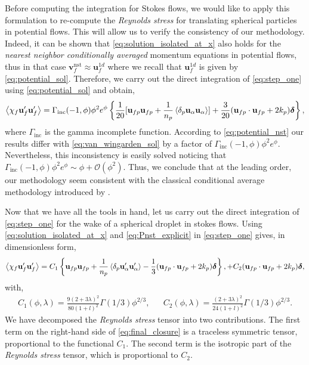 Before computing the integration for Stokes flows, we would like to apply this formulation to re-compute the \textit{Reynolds stress} for translating spherical particles in potential flows. 
This will allow us to verify the consistency of our methodology. 
Indeed, it can be shown that \ref{eq:solution_isolated_at_x} also holds for the \textit{nearest neighbor conditionally averaged} momentum equations in potential flows, thus in that case $\textbf{v}^\text{nst}_f \approx \textbf{u}_f^{1d}$ where we recall that $ \textbf{u}_f^{1d}$ is given by \ref{eq:potential_sol}.
Therefore, we carry out the direct integration of \ref{eq:step_one} using \ref{eq:potential_sol} and obtain, 
\begin{equation}
    \avg{\chi_f \textbf{u}_f'\textbf{u}_f'}
    = \Gamma_\text{inc}(-1,\phi)\phi^2 e^\phi \left\{
        \frac{1}{20}[\textbf{u}_{fp}\textbf{u}_{fp}+ \frac{1}{n_p}\pavg{\textbf{u}_\alpha\textbf{u}_\alpha}]
        + 
        \frac{3}{20} (\textbf{u}_{fp}\cdot \textbf{u}_{fp} + 2k_p)\bm\delta
    \right\},
    \label{eq:potential_nst}
\end{equation}
where $\Gamma_\text{inc}$ is the gamma incomplete function. 
According to \ref{eq:potential_nst} our results differ with \ref{eq:van_wingarden_sol} by a factor of $\Gamma_\text{inc}(-1,\phi)\phi^2 e^\phi$. 
Nevertheless, this inconsistency is easily solved noticing that $\Gamma_\text{inc}(-1,\phi)\phi^2 e^\phi \sim \phi + \mathcal{O}(\phi^2)$. 
Thus, we conclude that at the leading order, our methodology seem consistent with the classical conditional average methodology introduced by \citet{batchelor1972sedimentation}. 

Now that we have all the tools in hand, let us carry out the direct integration of \ref{eq:step_one} for the wake of a spherical droplet in stokes flows. 
Using \ref{eq:solution_isolated_at_x} and \ref{eq:Pnst_explicit} in \ref{eq:step_one} gives, in dimensionless form,  
\begin{equation}
    \avg{\chi_f  \textbf{u}_f'\textbf{u}_f'}
    = 
    C_1
    \left\{
        \textbf{u}_{fp}\textbf{u}_{fp}+ \frac{1}{n_p}\pavg{\textbf{u}_\alpha'\textbf{u}_\alpha'}
        -\frac{1}{3} (\textbf{u}_{fp}\cdot \textbf{u}_{fp} + 2k_p)\bm\delta
    \right\},    
    +  C_2
    (\textbf{u}_{fp}\cdot \textbf{u}_{fp} + 2k_p)\bm\delta,
    \label{eq:final_closure}
\end{equation}
with,
\begin{align*}
    C_1(\phi,\lambda)
    = \frac{9(2+3\lambda)^2}{80(1+l)^2}
        \Gamma(1/3) \phi^{2/3}
    ,
    &&
    C_2(\phi,\lambda)
    = \frac{(2+3\lambda)^2}{24(1+l)^2}
        \Gamma(1/3) \phi^{2/3}.
\end{align*}
We have decomposed the \textit{Reynolds stress} tensor into two contributions. 
The first term on the right-hand side of \ref{eq:final_closure} is a traceless symmetric tensor, proportional to the functional $C_1$. 
The second term is the isotropic part of the \textit{Reynolds stress} tensor, which is proportional to $C_2$. 

